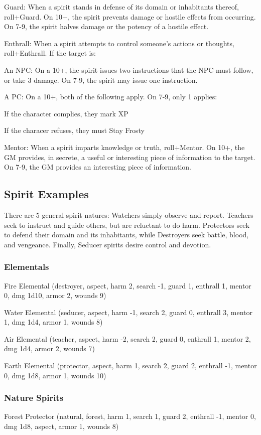 Guard: When a spirit stands in defense of its domain or inhabitants thereof, roll+Guard. On 10+, the spirit prevents damage or hostile effects from occurring. On 7-9, the spirit halves damage or the potency of a hostile effect.

Enthrall: When a spirit attempts to control someone’s actions or thoughts, roll+Enthrall. If the target is:

    An NPC: On a 10+, the spirit issues two instructions that the NPC must follow, or take 3 damage. On 7-9, the spirit may issue one instruction.

    A PC: On a 10+, both of the following apply. On 7-9, only 1 applies:

    If the character complies, they mark XP

    If the characer refuses, they must Stay Frosty

Mentor: When a spirit imparts knowledge or truth, roll+Mentor. On 10+, the GM provides, in secrete, a useful or interesting piece of information to the target. On 7-9, the GM provides an interesting piece of information.


\subsection{Spirit Examples}
There are 5 general spirit natures: Watchers simply observe and report. Teachers seek to instruct and guide others, but are reluctant to do harm. Protectors seek to defend their domain and its inhabitants, while Destroyers seek battle, blood, and vengeance. Finally, Seducer spirits desire control and devotion.

\subsubsection{Elementals}
Fire Elemental (destroyer, aspect, harm 2, search -1, guard 1, enthrall 1, mentor 0, dmg 1d10, armor 2, wounds 9)

Water Elemental (seducer, aspect, harm -1, search 2, guard 0, enthrall 3, mentor 1, dmg 1d4, armor 1, wounds 8)

Air Elemental (teacher, aspect, harm -2, search 2, guard 0, enthrall 1, mentor 2, dmg 1d4, armor 2, wounds 7)

Earth Elemental (protector, aspect, harm 1, search 2, guard 2, enthrall -1, mentor 0, dmg 1d8, armor 1, wounds 10)

\subsubsection{Nature Spirits}
Forest Protector (natural, forest, harm 1, search 1, guard 2, enthrall -1, mentor 0, dmg 1d8, aspect, armor 1, wounds 8)

